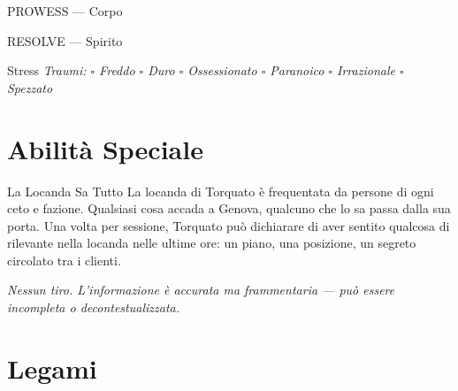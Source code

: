 \begin{attributoblock}[GrimaldiPurple]{PROWESS — Corpo}
\end{attributoblock}


\begin{attributoblock}[GrimaldiPurple]{RESOLVE — Spirito}
  \end{attributoblock}

\medskip
\begin{pgclockbox}{Stress \hfill {}}
  \small\textit{Traumi: $\square$ Freddo \quad $\square$ Duro \quad $\square$ Ossessionato \quad $\square$ Paranoico \quad $\square$ Irrazionale \quad $\square$ Spezzato}
\end{pgclockbox}

\section*{Abilità Speciale}

\begin{grimaldibox}{La Locanda Sa Tutto}
  La locanda di Torquato è frequentata da persone di ogni ceto e fazione.
  Qualsiasi cosa accada a Genova, qualcuno che lo sa passa dalla sua porta.
  Una volta per sessione, Torquato può dichiarare di aver sentito qualcosa
  di rilevante nella locanda nelle ultime ore: un piano, una posizione,
  un segreto circolato tra i clienti.

  \medskip\noindent\textit{Nessun tiro. L'informazione è accurata ma frammentaria
  — può essere incompleta o decontestualizzata.}
\end{grimaldibox}

\section*{Legami}

